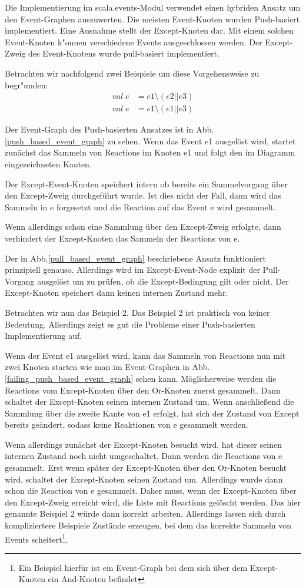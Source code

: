 Die Implementierung im scala.events-Modul verwendet einen hybriden Ansatz um den
Event-Graphen auszuwerten. Die meisten Event-Knoten wurden Push-basiert
implementiert. Eine Ausnahme stellt der Except-Knoten dar. Mit einem solchen
Event-Knoten k"onnen verschiedene Events ausgeschlossen werden. Der Except-Zweig
des Event-Knotens wurde pull-basiert implementiert.

Betrachten wir nachfolgend zwei Beispiele um diese Vorgehensweise zu begr"unden:
\begin{eqnarray}
val \; e & = e1 \setminus (e2 || e3)\\
val \; e & = e1 \setminus (e1 || e3)
\end{eqnarray}

Der Event-Graph des Push-basierten Ansatzes ist in
Abb.\ref{push_based_event_graph} zu sehen. Wenn das Event e1 ausgelöst wird,
startet zunächst das Sammeln von Reactions im Knoten e1 und folgt den im
Diagramm eingezeichneten Kanten. 
 
Der Except-Event-Knoten speichert intern ob bereits ein Sammelvorgang über den
Except-Zweig durchgeführt wurde. Ist dies nicht der Fall, dann wird das Sammeln
in e forgesetzt und die Reaction auf das Event e wird gesammelt. 

Wenn allerdings schon eine Sammlung über den Except-Zweig erfolgte, dann
verhindert der Except-Knoten das Sammeln der Reactions von e.

Der in Abb.\ref{pull_based_event_graph} beschriebene Ansatz funktioniert
prinzipiell genauso. Allerdings wird im Except-Event-Node explizit der Pull-Vorgang ausgelöst um zu
prüfen, ob die Except-Bedingung gilt oder nicht. Der Except-Knoten speichert
dann keinen internen Zustand mehr.

Betrachten wir nun das Beispiel 2. Das Beispiel 2 ist praktisch von keiner
Bedeutung. Allerdings zeigt es gut die Probleme einer Push-basierten
Implementierung auf. 

Wenn der Event e1 ausgelöst wird, kann das Sammeln von Reactions nun mit zwei
Knoten starten wie man im Event-Graphen in Abb.
\ref{failing_push_based_event_graph} sehen kann. Möglicherweise werden die
Reactions vom Except-Knoten über den Or-Knoten zuerst gesammelt. Dann schaltet 
der Except-Knoten seinen internen Zustand um. Wenn anschließend die Sammlung
über  die zweite Kante von e1 erfolgt, hat sich der Zustand von Except bereits 
geändert, sodass keine Reaktionen von e gesammelt werden.

Wenn allerdings zunächst der Except-Knoten besucht wird, hat dieser seinen
internen Zustand noch nicht umgeschaltet. Dann werden die Reactions von e
gesammelt. Erst wenn später der Except-Knoten über den Or-Knoten besucht wird,
schaltet der Except-Knoten seinen Zustand um. Allerdings wurde dann schon die
Reaction von e gesammelt. Daher muss, wenn der Except-Knoten über den
Except-Zweig erreicht wird, die Liste mit Reactions gelöscht werden. Das hier
genannte Beispiel 2 würde dann korrekt arbeiten. Allerdings lassen sich durch
kompliziertere Beispiele Zustände erzeugen, bei dem das korrekte Sammeln von
Events scheitert\footnote{Ein Beispiel hierfür ist ein Event-Graph bei dem sich
über dem Except-Knoten ein And-Knoten befindet}.

